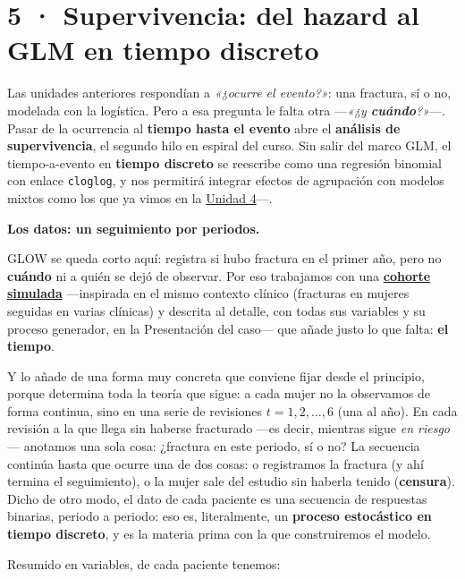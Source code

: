 \documentclass[
  letterpaper,
  DIV=11,
  numbers=noendperiod]{scrartcl}
\begin{document}
\hypertarget{sec-u15}{%
\section{5 · Supervivencia: del hazard al GLM en tiempo
discreto}\label{sec-u15}}

Las unidades anteriores respondían a \emph{«¿ocurre el evento?»}: una
fractura, sí o no, modelada con la logística. Pero a esa pregunta le
falta otra ---\emph{«¿y \textbf{cuándo}?»}---. Pasar de la ocurrencia al
\textbf{tiempo hasta el evento} abre el \textbf{análisis de
supervivencia}, el segundo hilo en espiral del curso. Sin salir del
marco GLM, el tiempo-a-evento en \textbf{tiempo discreto} se reescribe
como una regresión binomial con enlace \texttt{cloglog}, y nos permitirá
integrar efectos de agrupación con modelos mixtos como los que ya vimos
en la \protect\hyperlink{sec-u14}{Unidad 4}---.

\textbf{Los datos: un seguimiento por periodos.}

GLOW se queda corto aquí: registra si hubo fractura en el primer año,
pero no \textbf{cuándo} ni a quién se dejó de observar. Por eso
trabajamos con una \protect\hyperlink{sec-datos-cohorte}{\textbf{cohorte
simulada}} ---inspirada en el mismo contexto clínico (fracturas en
mujeres seguidas en varias clínicas) y descrita al detalle, con todas
sus variables y su proceso generador, en la Presentación del caso--- que
añade justo lo que falta: \textbf{el tiempo}.

Y lo añade de una forma muy concreta que conviene fijar desde el
principio, porque determina toda la teoría que sigue: a cada mujer no la
observamos de forma continua, sino en una serie de revisiones
\(t=1,2,\dots,6\) (una al año). En cada revisión a la que llega sin
haberse fracturado ---es decir, mientras sigue \emph{en riesgo}---
anotamos una sola cosa: ¿fractura en este periodo, sí o no? La secuencia
continúa hasta que ocurre una de dos cosas: o registramos la fractura (y
ahí termina el seguimiento), o la mujer sale del estudio sin haberla
tenido (\textbf{censura}). Dicho de otro modo, el dato de cada paciente
es una secuencia de respuestas binarias, periodo a periodo: eso es,
literalmente, un \textbf{proceso estocástico en tiempo discreto}, y es
la materia prima con la que construiremos el modelo.

Resumido en variables, de cada paciente tenemos:
\end{document}

